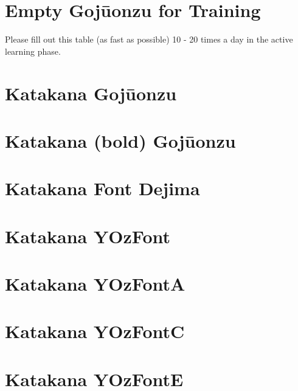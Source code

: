 \section{Empty Gojūonzu for Training}\label{app:Leere50LauteTafel} Please
fill out this table (as fast as possible) 10 - 20 times a day in the active learning phase.

\newpage\section{Katakana Gojūonzu}
\newpage\section{Katakana (bold) Gojūonzu}

\newpage\JapaneseDejima\section{Katakana Font Dejima}
\JapaneseDefault
\newpage\JapaneseYOzFont\section{Katakana YOzFont}
\JapaneseDefault
\newpage\JapaneseYOzFontA\section{Katakana YOzFontA}
\JapaneseDefault
\newpage\JapaneseYOzFontC\section{Katakana YOzFontC}
\JapaneseDefault
\newpage\JapaneseYOzFontE\section{Katakana YOzFontE}
